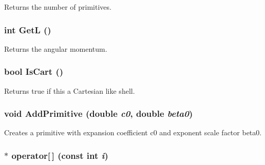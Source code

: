 Returns the number of primitives. \hypertarget{classJKBuilder_1_1Shell_a7cc8fc5bc043267a7b47e69503e0e308}{
\subsubsection[{GetL}]{\setlength{\rightskip}{0pt plus 5cm}int GetL ()}}
\label{classJKBuilder_1_1Shell_a7cc8fc5bc043267a7b47e69503e0e308}


Returns the angular momentum. \hypertarget{classJKBuilder_1_1Shell_a75c22d97e837f5c439eb51aa223bed98}{
\subsubsection[{IsCart}]{\setlength{\rightskip}{0pt plus 5cm}bool IsCart ()}}
\label{classJKBuilder_1_1Shell_a75c22d97e837f5c439eb51aa223bed98}


Returns true if this a Cartesian like shell. \hypertarget{classJKBuilder_1_1Shell_a20ec923cb07d5d3762fffa4501d09924}{
\subsubsection[{AddPrimitive}]{\setlength{\rightskip}{0pt plus 5cm}void AddPrimitive (double {\em c0}, \/  double {\em beta0})}}
\label{classJKBuilder_1_1Shell_a20ec923cb07d5d3762fffa4501d09924}


Creates a primitive with expansion coefficient c0 and exponent scale factor beta0. \hypertarget{classJKBuilder_1_1Shell_ae98a68bcb237e53c8c063aded1b34f2e}{
\subsubsection[{operator[]}]{ $\ast$ operator\mbox{[}$\,$\mbox{]} (const int {\em i})}}
\label{classJKBuilder_1_1Shell_ae98a68bcb237e53c8c063aded1b34f2e}


